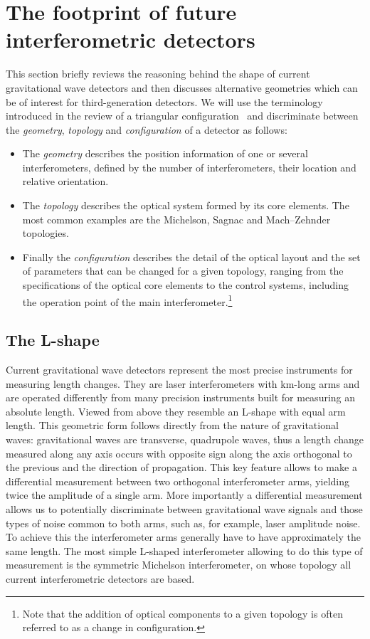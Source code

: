 \FloatBarrier
\section{The footprint of future interferometric detectors}
\label{sec:adf}
%

This section briefly reviews the reasoning behind the shape of current gravitational wave detectors and then
discusses alternative geometries which can be of interest for third-generation detectors. We
will use the terminology introduced in the review of a triangular configuration~\cite{Freise09} and
discriminate between the
\emph{geometry}, \emph{topology} and \emph{configuration} of a detector as follows:
\begin{itemize}
\item The \emph{geometry} describes the position information of one or several interferometers,
defined by the number of interferometers, their location and relative orientation.
\item The \emph{topology} describes the optical system formed by its core elements.
The most common examples are the Michelson, Sagnac and Mach--Zehnder topologies.
\item Finally the \emph{configuration} describes the detail of the optical layout and the set of parameters that
can be changed for a given topology, ranging from the specifications of the optical core
elements to the control systems, including the operation point of the main interferometer.\footnote{Note that the
addition of optical components to a given topology is often referred to as a change in configuration.}
\end{itemize}
\FloatBarrier
\subsection{The L-shape}
Current gravitational wave detectors represent the most precise instruments for measuring length changes.
They are laser interferometers with km-long arms and are operated differently from many precision
instruments built for measuring an absolute length. Viewed from above
they resemble an L-shape with equal arm length.
This geometric form follows directly from the nature of gravitational
waves: gravitational waves are transverse, quadrupole waves, thus a length change measured along any axis
occurs with opposite sign along the axis orthogonal to the previous and the direction of propagation.
This key feature allows to make a differential measurement between two orthogonal interferometer
arms, yielding twice the amplitude of a single arm. More importantly a differential measurement allows us to
potentially discriminate between gravitational wave signals and those types of noise common to both arms, such as,
for example, laser amplitude noise. To achieve this the interferometer arms generally have to have approximately
the same length. The most simple L-shaped interferometer allowing to do this type
of measurement is the symmetric Michelson interferometer, on whose topology all current interferometric detectors
are based.

